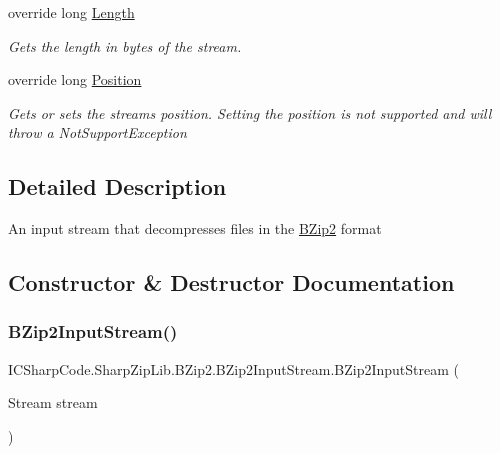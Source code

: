 \begin{DoxyCompactItemize}
override long \hyperlink{class_i_c_sharp_code_1_1_sharp_zip_lib_1_1_b_zip2_1_1_b_zip2_input_stream_ae1c38ac6eb9dfe655889f767306d7885}{Length}
\begin{DoxyCompactList}\small\item\em Gets the length in bytes of the stream. \end{DoxyCompactList}\item 
override long \hyperlink{class_i_c_sharp_code_1_1_sharp_zip_lib_1_1_b_zip2_1_1_b_zip2_input_stream_a3a98577243a092ea9ca4ca13a7405295}{Position}
\begin{DoxyCompactList}\small\item\em Gets or sets the streams position. Setting the position is not supported and will throw a Not\+Support\+Exception \end{DoxyCompactList}\end{DoxyCompactItemize}


\subsection{Detailed Description}
An input stream that decompresses files in the \hyperlink{namespace_i_c_sharp_code_1_1_sharp_zip_lib_1_1_b_zip2}{B\+Zip2} format 



\subsection{Constructor \& Destructor Documentation}
\mbox{\label{class_i_c_sharp_code_1_1_sharp_zip_lib_1_1_b_zip2_1_1_b_zip2_input_stream_a11e9d5b3f44614e8cdc908401156aa74}} 
\subsubsection{\texorpdfstring{B\+Zip2\+Input\+Stream()}{BZip2InputStream()}}
{\footnotesize\ttfamily I\+C\+Sharp\+Code.\+Sharp\+Zip\+Lib.\+B\+Zip2.\+B\+Zip2\+Input\+Stream.\+B\+Zip2\+Input\+Stream (\begin{DoxyParamCaption}\item[{Stream}]{stream }\end{DoxyParamCaption})\hspace{0.3cm}{\ttfamily [inline]}}



